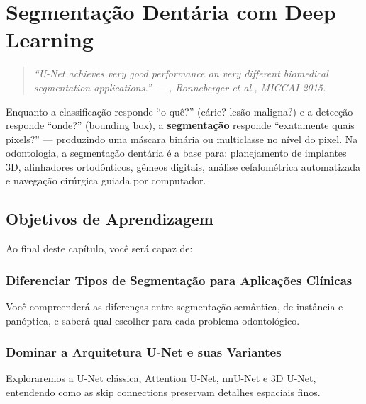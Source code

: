 
\chapter{Segmentação Dentária com Deep Learning}
\label{cap:segmentacao-dental}

\nivelquatro

\begin{quote}
\itshape\small
``U-Net achieves very good performance on very different biomedical segmentation
applications.'' --- , Ronneberger et al., MICCAI 2015.
\end{quote}

Enquanto a classificação responde ``o quê?'' (cárie? lesão maligna?) e a detecção
responde ``onde?'' (bounding box), a \textbf{segmentação} responde ``exatamente
quais pixels?'' --- produzindo uma máscara binária ou multiclasse no nível do pixel.
Na odontologia, a segmentação dentária é a base para: planejamento de implantes
3D, alinhadores ortodônticos, gêmeos digitais, análise cefalométrica automatizada
e navegação cirúrgica guiada por computador.


\section{Objetivos de Aprendizagem}

Ao final deste capítulo, você será capaz de:

\subsection{Diferenciar Tipos de Segmentação para Aplicações Clínicas}
Você compreenderá as diferenças entre segmentação semântica, de instância e panóptica, e saberá qual escolher para cada problema odontológico.

\subsection{Dominar a Arquitetura U-Net e suas Variantes}
Exploraremos a U-Net clássica, Attention U-Net, nnU-Net e 3D U-Net, entendendo como as skip connections preservam detalhes espaciais finos.

